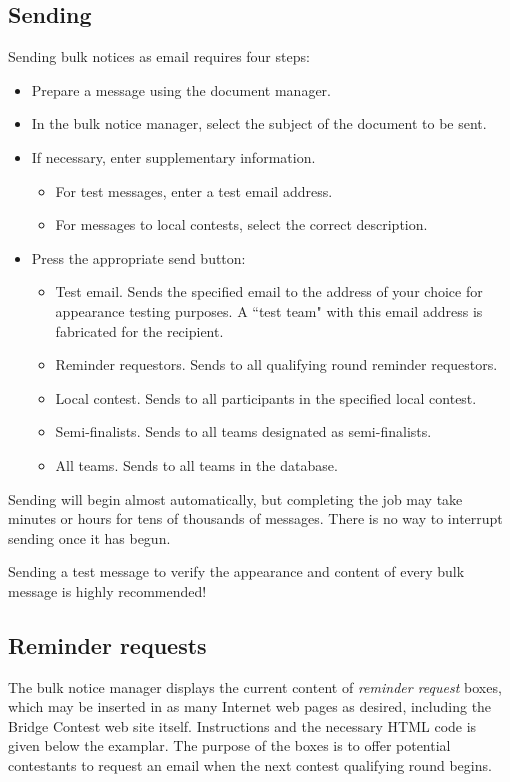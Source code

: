 \documentclass[11pt,letterpaper]{refart}
\def\ui#1{\textsf{#1}}
\begin{document}
\subsection{Sending}
Sending bulk notices as email requires four steps:
\begin{itemize}
\item Prepare a message using the document manager.
\item In the bulk notice manager, select the subject of the document to be sent.
\item If necessary, enter supplementary information.  
  \begin{itemize}
  \item For test messages, enter a test email address.
  \item For messages to local contests, select the correct description.
  \end{itemize}
\item Press the appropriate send button:   
  \begin{itemize}
  \item \ui{Test email}. Sends the specified email to the address of your choice
    for appearance testing purposes.  A ``test team" with this email address
    is fabricated for the recipient.
  \item \ui{Reminder requestors}. Sends to all qualifying round reminder requestors.
  \item \ui{Local contest}. Sends to all participants in the specified local contest.
  \item \ui{Semi-finalists}. Sends to all teams designated as semi-finalists.
  \item \ui{All teams}. Sends to all teams in the database.
  \end{itemize}
\end{itemize}
Sending will begin almost automatically, but completing the job may take minutes
or hours for tens of thousands of messages.  There is no way to interrupt sending
once it has begun.

Sending a test message to verify the appearance and content of every bulk message
is highly recommended!

\subsection{Reminder requests}
The bulk notice manager displays the current content of  
\emph{reminder request} boxes, which may be inserted in as many
Internet web pages as desired,
including the Bridge Contest web site itself.
Instructions and the necessary HTML code is given below the examplar.  The
purpose of the boxes is to offer potential contestants to request an email when
the next contest qualifying round begins.
\end{document}
